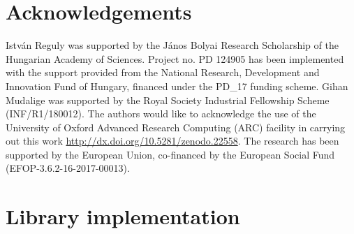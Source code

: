 \documentclass[number]{elsarticle}
\begin{document}
% 


\section*{Acknowledgements}
\noindent Istv\'an Reguly was supported by the J\'anos Bolyai Research 
Scholarship of the Hungarian Academy of Sciences. Project no. PD 124905 has been 
implemented with the support provided from the National Research, Development 
and Innovation Fund of Hungary, financed under the PD\_17 funding scheme. Gihan 
Mudalige was supported by the Royal Society Industrial Fellowship Scheme 
(INF/R1/180012). The authors would like to acknowledge the use of the University 
of Oxford Advanced Research Computing (ARC) facility in carrying out this work 
\url{http://dx.doi.org/10.5281/zenodo.22558}. The research has been supported 
by the European Union, co-financed by the European Social Fund 
(EFOP-3.6.2-16-2017-00013).
%
%



\pagebreak
%
%
\appendix

\section{Library implementation}\label{library-implementation}



\end{document}
